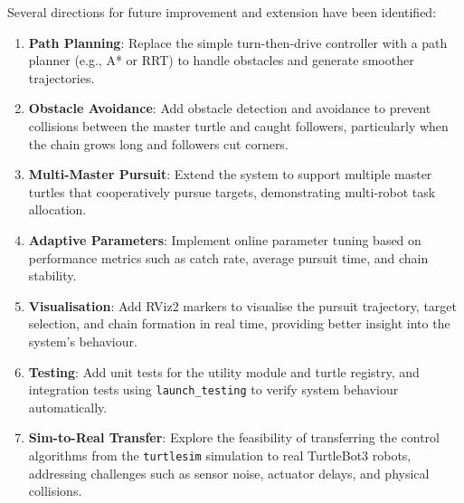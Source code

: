 Several directions for future improvement and extension have been identified:

\begin{enumerate}
  \item \textbf{Path Planning}: Replace the simple turn-then-drive controller with a path planner (e.g., A* or RRT) to handle obstacles and generate smoother trajectories.

  \item \textbf{Obstacle Avoidance}: Add obstacle detection and avoidance to prevent collisions between the master turtle and caught followers, particularly when the chain grows long and followers cut corners.

  \item \textbf{Multi-Master Pursuit}: Extend the system to support multiple master turtles that cooperatively pursue targets, demonstrating multi-robot task allocation.

  \item \textbf{Adaptive Parameters}: Implement online parameter tuning based on performance metrics such as catch rate, average pursuit time, and chain stability.

  \item \textbf{Visualisation}: Add RViz2 markers to visualise the pursuit trajectory, target selection, and chain formation in real time, providing better insight into the system's behaviour.

  \item \textbf{Testing}: Add unit tests for the utility module and turtle registry, and integration tests using \texttt{launch\_testing} to verify system behaviour automatically.

  \item \textbf{Sim-to-Real Transfer}: Explore the feasibility of transferring the control algorithms from the \texttt{turtlesim} simulation to real TurtleBot3 robots, addressing challenges such as sensor noise, actuator delays, and physical collisions.
\end{enumerate}
